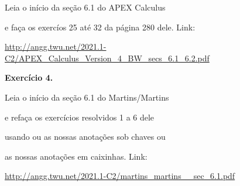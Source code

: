 \documentclass[oneside,12pt]{article}
\begin{document}
Leia o início da seção 6.1 do APEX Calculus

e faça os exercíos 25 até 32 da página 280 dele. Link:

\ssk

{\scriptsize

\url{http://angg.twu.net/2021.1-C2/APEX_Calculus_Version_4_BW_secs_6.1_6.2.pdf}

}

\bsk
\bsk

{\bf Exercício 4.}

Leia o início da seção 6.1 do Martins/Martins

e refaça os exercícios resolvidos 1 a 6 dele

usando ou as nossas anotações sob chaves ou

as nossas anotações em caixinhas. Link:

\ssk

{\scriptsize

\url{http://angg.twu.net/2021.1-C2/martins_martins__sec_6.1.pdf}

}



\end{document}
